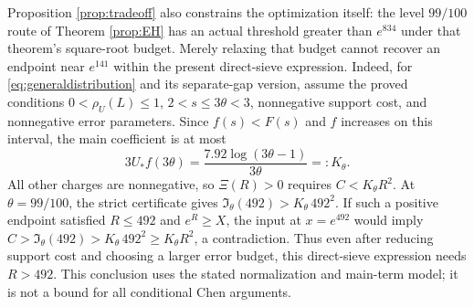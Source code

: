 \documentclass[11pt]{article}
\begin{document}
Proposition \ref{prop:tradeoff} also constrains the optimization itself:
the level $99/100$ route of Theorem \ref{prop:EH} has an actual threshold
greater than $e^{834}$ under that theorem's square-root budget.
Merely relaxing that budget cannot recover
an endpoint near $e^{141}$ within the present direct-sieve expression.
Indeed, for \eqref{eq:generaldistribution} and its separate-gap
version, assume the proved conditions $0<\rho_U(L)\le1$,
$2<s\le3\theta<3$, nonnegative support cost, and nonnegative error
parameters. Since $f(s)<F(s)$ and $f$ increases on this interval,
the main coefficient is at most
\[
3U_*f(3\theta)
=\frac{7.92\log(3\theta-1)}{3\theta}
=:K_\theta.
\]
All other charges are nonnegative, so $\Xi(R)>0$ requires
$C<K_\theta R^2$. At $\theta=99/100$, the strict certificate gives
$\mathfrak I_\theta(492)>K_\theta\,492^2$.
If such a positive endpoint satisfied $R\le492$ and $e^R\ge X$,
the input at $x=e^{492}$ would imply
$C>\mathfrak I_\theta(492)>K_\theta\,492^2\ge K_\theta R^2$,
a contradiction. Thus even after reducing support cost and choosing
a larger error budget, this direct-sieve expression needs $R>492$.
This conclusion uses the stated normalization and main-term model;
it is not a bound for all conditional Chen arguments.
\end{document}
